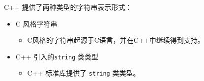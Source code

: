 \begin{frame} \ft{\secname}
  \begin{free}[C++ 字符串]{}
    C++ 提供了两种类型的字符串表示形式：
    \begin{itemize}
    \item
      C 风格字符串
      \\[0.05in]
      \begin{itemize}
      \item C风格的字符串起源于C语言，并在C++中继续得到支持。
      \end{itemize} \vspace{.1in} 
    \item
      C++ 引入的\lstinline|string| 类类型 \\[.05in]
      \begin{itemize}
      \item C++ 标准库提供了 \lstinline|string| 类类型。
      \end{itemize}
    \end{itemize}
  \end{free}

\end{frame}

\begin{frame} \ft{\secname}
  
  
\end{frame}




